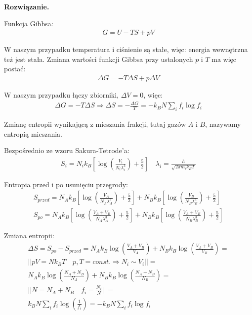 \documentclass[11pt,a4paper]{article}
\newenvironment{solution}{\vspace{1cm} \par\textbf{Rozwiązanie.} \vspace{1cm}}{}
\begin{document}
\begin{solution}

Funkcja Gibbsa:
\begin{align*}
G = U - TS + pV
\end{align*}

W naszym przypadku temperatura i ciśnienie są stałe, więc: energia wewnętrzna też jest stała.
Zmiana wartości funkcji Gibbsa przy ustalonych $p$ i $T$ ma więc postać:
\begin{align*}
  \Delta G = -T\Delta S + p\Delta V
\end{align*}

W naszym przypadku łączy zbiorniki, $\Delta V = 0$, więc:
\begin{align*}
  \Delta G = -T\Delta S  \Rightarrow \Delta S = -\frac{\Delta G}{T} 
  = -k_B N \sum_i f_i \log f_i
\end{align*}

Zmianę entropii wynikającą z mieszania frakcji, tutaj gazów $A$ i $B$, 
nazywamy entropią mieszania.

Bezpośrednio ze wzoru Sakura-Tetrode'a:
\begin{align*}
  S_{i} = N_{i}k_B \left[ \log\left( \frac{V_{i}}{N_{i}\lambda_{i}^3} \right) + \frac{5}{2} \right] \quad \lambda_{i} = \frac{h}{\sqrt{2\pi m_i k_B T}}
\end{align*}

Entropia przed i po usunięciu przegrody:
\begin{align*}
  S_{przed} =
  N_Ak_B \left[ \log\left( \frac{V_{A}}{N_A\lambda_{A}^3} \right) + \frac{5}{2} \right] +
  N_Bk_B \left[ \log\left( \frac{V_{B}}{N_B\lambda_{B}^3} \right) + \frac{5}{2} \right] \\
  S_{po} =
  N_Ak_B \left[ \log\left( \frac{V_A+V_B}{N_A\lambda_{A}^3} \right) + \frac{5}{2} \right] +
  N_Bk_B \left[ \log\left( \frac{V_A+V_B}{N_B\lambda_{B}^3} \right) + \frac{5}{2} \right]
\end{align*}

Zmiana entropii:
\begin{align*}
  \Delta S = S_{po} - S_{przed} =
  N_Ak_B \log\left( \frac{V_A+V_B}{V_A} \right) +
  N_Bk_B \log\left( \frac{V_A+V_B}{V_B} \right) = \\
  || pV = Nk_BT \quad p,T=const.  \Rightarrow N_{i} \sim V_{i} || = \\
  N_Ak_B \log\left( \frac{N_A+N_B}{N_A} \right) +
  N_Bk_B \log\left( \frac{N_A+N_B}{N_B} \right) = \\
  || N = N_A + N_B \quad f_i = \frac{N_i}{N} || = \\
  k_B N \sum_i f_i \log\left( \frac{1}{f_i} \right) = -k_B N \sum_i f_i \log f_i
\end{align*}

\newpage
\end{solution}
\end{document}
